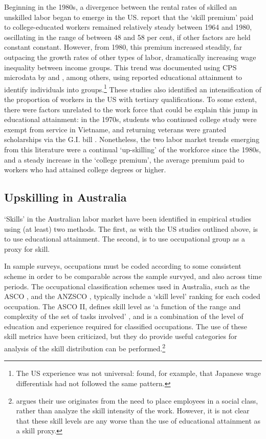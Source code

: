 Beginning in the 1980s, a divergence between the rental rates of skilled an unskilled labor began to emerge in the US. \citet{Acemoglu2011} report that the `skill premium' paid to college-educated workers remained relatively steady between 1964 and 1980, oscillating in the range of between 48 and 58 per cent, if other factors are held constant constant. However, from 1980, this premium increased steadily, far outpacing the growth rates of other types of labor, dramatically increasing wage inequality between income groups. This trend was documented using CPS microdata by \citet{Karoly1992} and \citet{Katz1989}, among others, using reported educational attainment to identify individuals into groups.\footnote{The US experience was not universal: \citet{Katz1989} found, for example, that Japanese wage differentials had not followed the same pattern.} These studies also identified an intensification of the proportion of workers in the US with tertiary qualifications. To some extent, there were factors unrelated to the work force that could be explain this jump in educational attainment: in the 1970s, students who continued college study were exempt from service in Vietname, and returning veterans were granted scholarships via the G.I. bill \citet{Acemoglu2011}. Nonetheless, the two labor market trends emerging from this literature were a continual `up-skilling' of the workforce since the 1980s, and a steady increase in the `college premium', the average premium paid to workers who had attained college degrees or higher.

\subsection{Upskilling in Australia}\label{sec:upskillingau}

`Skills' in the Australian labor market have been identified in empirical studies using (at least) two methods. The first, as with the US studies outlined above, is to use educational attainment. The second, is to use occupational group as a proxy for skill.

In sample surveys, occupations must be coded according to some consistent scheme in order to be comparable across the sample survyed, and also across time periods. The occupational classification schemes used in Australia, such as the ASCO \citep{Castles1986}, and the ANZSCO \citep{Trewin2006}, typically include a `skill level' ranking for each coded occupation. The ASCO II, defines skill level as `a function of the range and complexity of the set of tasks involved' \citep[p.14]{Castles1986}, and is a combination of the level of education and experience required for classified occupations. The use of these skill metrics have been criticized, but they do provide useful categories for analysis of the skill distribution can be performed.\footnote{\citet{Cully1999} argues their use originates from the need to place employees in a social class, rather than analyze the skill intensity of the work. However, it is not clear that these skill levels are any worse than the use of educational attainment as a skill proxy.}

